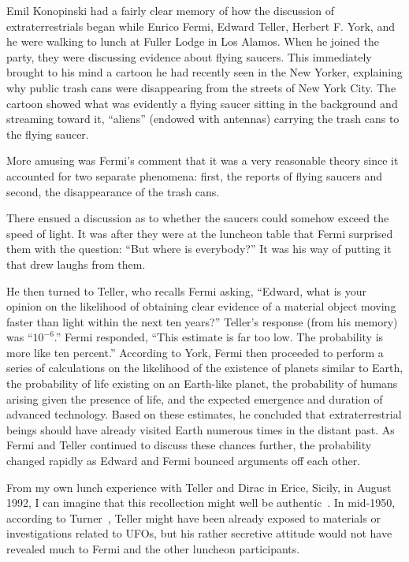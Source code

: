 Emil Konopinski had a fairly clear memory of how the discussion of extraterrestrials began while Enrico Fermi, Edward Teller, Herbert F. York, and he were walking to lunch at Fuller Lodge in Los Alamos. When he joined the party, they were discussing evidence about flying saucers. This immediately brought to his mind a cartoon he had recently seen in the New Yorker, explaining why public trash cans were disappearing from the streets of New York City. The cartoon showed what was evidently a flying saucer sitting in the background and streaming toward it, ``aliens'' (endowed with antennas) carrying the trash cans to the flying saucer.

More amusing was Fermi's comment that it was a very reasonable theory since it accounted for two separate phenomena: first, the reports of flying saucers and second, the disappearance of the trash cans.

There ensued a discussion as to whether the saucers could somehow exceed the speed of light. It was after they were at the luncheon table that Fermi surprised them with the question: ``But where is everybody?'' It was his way of putting it that drew laughs from them.

He then turned to Teller, who recalls Fermi asking, ``Edward, what is your opinion on the likelihood of obtaining clear evidence of a material object moving faster than light within the next ten years?'' Teller's response (from his memory) was ``$10^{-6}$.'' Fermi responded, ``This estimate is far too low. The probability is more like ten percent.'' According to York, Fermi then proceeded to perform a series of calculations on the likelihood of the existence of planets similar to Earth, the probability of life existing on an Earth-like planet, the probability of humans arising given the presence of life, and the expected emergence and duration of advanced technology. Based on these estimates, he concluded that extraterrestrial beings should have already visited Earth numerous times in the distant past. As Fermi and Teller continued to discuss these chances further, the probability changed rapidly as Edward and Fermi bounced arguments off each other.

From my own lunch experience with Teller and Dirac in Erice, Sicily, in August 1992,
I can imagine that this recollection might well be authentic~\cite{dirac-81}.
In mid-1950, according to Turner~\cite{TurnerAustralia1971}, Teller might have been
already exposed to materials or investigations related to UFOs, but his rather secretive attitude would not have revealed much to Fermi and the other luncheon participants.


